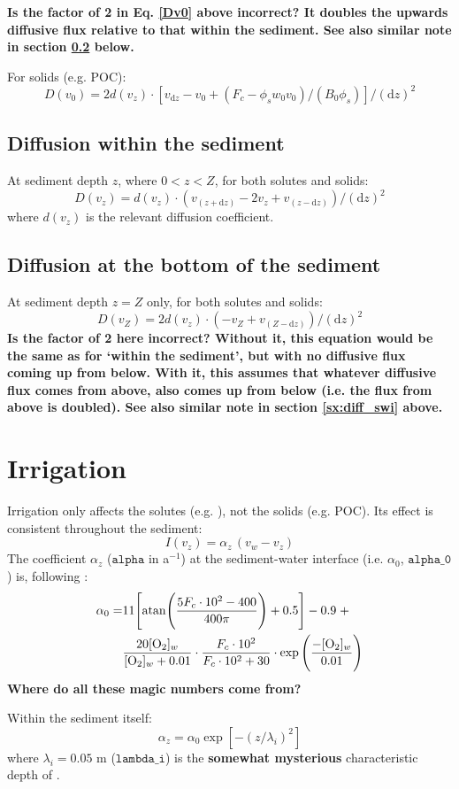 \documentclass[a4paper]{article}
\newcommand{\D}[1]{\mathrm{d}#1}
\newcommand{\code}[1]{\texttt{#1}}
\newcommand{\wtf}[1]{\textcolor{Cerulean}{\textbf{#1}}}
\begin{document}
\wtf{Is the factor of 2 in Eq. \eqref{Dv0} above incorrect? It doubles the upwards diffusive flux relative to that within the sediment. See also similar note in section \ref{sx:diff_bot} below.}

For solids (e.g. POC):
\begin{equation}
D(v_0) = 2 d(v_z) \cdot [v_{\D{z}} - v_0 + (F_c - \phi_s w_0 v_0) / (B_0 \phi_s)] / (\D{z})^2
\end{equation}

\subsection{Diffusion within the sediment}

At sediment depth $z$, where $0 < z < Z$, for both solutes and solids:
\begin{equation}
D(v_z) = d(v_z) \cdot (v_{(z+\D{z})} - 2 v_z + v_{(z-\D{z})}) / (\D{z})^2
\end{equation}
where $d(v_z)$ is the relevant diffusion coefficient.

\subsection{Diffusion at the bottom of the sediment}\label{sx:diff_bot}

At sediment depth $z = Z$ only, for both solutes and solids:
\begin{equation}
D(v_Z) = 2 d(v_z) \cdot (-v_Z + v_{(Z-\D{z})}) / (\D{z})^2
\end{equation}
\wtf{Is the factor of 2 here incorrect? Without it, this equation would be the same as for `within the sediment', but with no diffusive flux coming up from below. With it, this assumes that whatever diffusive flux comes from above, also comes up from below (i.e. the flux from above is doubled). See also similar note in section \ref{sx:diff_swi} above.}

\section{Irrigation}

Irrigation only affects the solutes (e.g. ), not the solids (e.g. POC). Its effect is consistent throughout the sediment:
\begin{equation}
I(v_z) = \alpha_z \, (v_w - v_z)
\end{equation}
The coefficient $\alpha_z$ ($\code{alpha}$ in a$^{-1}$) at the sediment-water interface (i.e. $\alpha_0$, $\code{alpha\_0}$) is, following \citet{archer_model_2002}:
\begin{equation}
\begin{split}
\alpha_0 = & 11 \Bigg[ \mathrm{atan} \Bigg( \frac{5 F_c \cdot 10^2 - 400}{400 \pi} \Bigg) + 0.5 \Bigg] - 0.9 \; + \\
& \frac{20 [\ce{O2}]_w}{[\ce{O2}]_w + 0.01} \cdot \frac{F_c \cdot 10^2}{F_c \cdot 10^2 + 30} \cdot \exp \Bigg(\frac{-[\ce{O2}]_w}{0.01}\Bigg)
\end{split}
\end{equation}
\wtf{Where do all these magic numbers come from?}

Within the sediment itself:
\begin{equation}
\alpha_z = \alpha_0 \exp [-(z/\lambda_i)^2]
\end{equation}
where $\lambda_i = 0.05$ m ($\code{lambda\_i}$) is the \wtf{somewhat mysterious} characteristic depth of \citet{archer_model_2002}.


\end{document}
